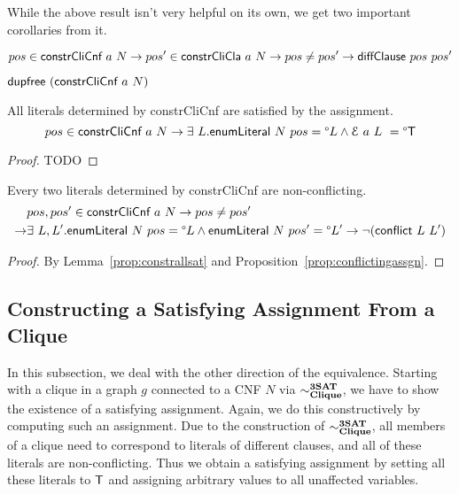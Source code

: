 \documentclass[a4paper,UKenglish,cleveref, autoref]{lipics-v2019}
\begin{document}
While the above result isn't very helpful on its own, we get two important corollaries from it.

\begin{corollary}
  \[ pos \in \normalfont\textsf{constrCliCnf}~a~N \rightarrow pos' \in \normalfont\textsf{constrCliCla}~a~N \rightarrow pos \neq pos' \rightarrow \normalfont\textsf{diffClause}~pos~pos' \]
\end{corollary}

\begin{corollary}
   $\normalfont\textsf{dupfree}~(\normalfont\textsf{constrCliCnf}~a~N)$
\end{corollary}

\begin{lemma}\label{prop:constrallsat}
  All literals determined by \normalfont\textsf{constrCliCnf} are satisfied by the assignment.
  \[ pos \in \normalfont\textsf{constrCliCnf}~a~N \rightarrow \exists~L. \normalfont\textsf{enumLiteral}~N~pos = \degree L \land \mathcal{E}~a~L~ = \degree\mathsf{T} \]
\end{lemma}
\begin{proof}
  TODO
\end{proof}

\begin{proposition}
  Every two literals determined by \normalfont\textsf{constrCliCnf} are non-conflicting.
  \begin{align*}
    &pos, pos' \in \normalfont\textsf{constrCliCnf}~a~N \rightarrow pos \neq pos' \\
    \rightarrow& \exists~L,L'. \normalfont\textsf{enumLiteral}~N~pos = \degree L \land \normalfont\textsf{enumLiteral}~N~pos' = \degree L' \rightarrow \lnot{(\normalfont\textsf{conflict}~L~L')} 
 \end{align*}
\end{proposition}
\begin{proof}
  By Lemma~\ref{prop:constrallsat} and Proposition~\ref{prop:conflictingassgn}.
\end{proof}

\subsection{Constructing a Satisfying Assignment From a Clique}
In this subsection, we deal with the other direction of the equivalence. Starting with a clique in a graph $g$ connected to a CNF $N$ via $\sim^{\textbf{3SAT}}_{\textbf{Clique}}$, we have to show the existence of a satisfying assignment. Again, we do this constructively by computing such an assignment. Due to the construction of $\sim^{\textbf{3SAT}}_{\textbf{Clique}}$, all members of a clique need to correspond to literals of different clauses, and all of these literals are non-conflicting. Thus we obtain a satisfying assignment by setting all these literals to $\mathsf{T}$ and assigning arbitrary values to all unaffected variables. 
\end{document}
